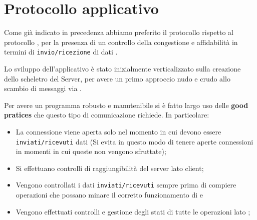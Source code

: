 \chapter{Protocollo applicativo}
  Come già indicato in precedenza abbiamo preferito il protocollo  rispetto al protocollo , per la presenza di un controllo della congestione e affidabilità in termini di \texttt{invio/ricezione} di dati\footnotemark {} .

  Lo sviluppo dell'applicativo è stato inizialmente verticalizzato sulla creazione dello scheletro del Server, per avere un primo approccio nudo e crudo allo scambio di messaggi via .

  Per avere un programma robusto e manutenibile si è fatto largo uso delle \textbf{good pratices} che questo tipo di comunicazione richiede. In particolare:
  \begin{itemize}
    \item La connessione viene aperta solo nel momento in cui devono essere \texttt{inviati/ricevuti} dati (Si evita in questo modo di tenere aperte connessioni in momenti in cui queste non vengono sfruttate);
    \item Si effettuano controlli di raggiungibilità del server lato client\footnotemark {};
    \item Vengono controllati i dati \texttt{inviati/ricevuti} sempre prima di compiere operazioni che possano minare il corretto funzionamento di  e  \footnotemark {}
    \item Vengono effettuati controlli e gestione degli stati di tutte le operazioni lato ;
  \end{itemize}
